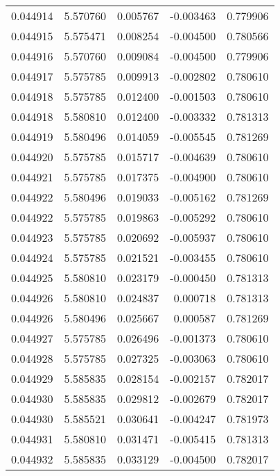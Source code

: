 \begin{tabular}{lrrrr}
0.044914    &  5.570760 &  0.005767 & -0.003463 &             0.779906 \\
0.044915    &  5.575471 &  0.008254 & -0.004500 &             0.780566 \\
0.044916    &  5.570760 &  0.009084 & -0.004500 &             0.779906 \\
0.044917    &  5.575785 &  0.009913 & -0.002802 &             0.780610 \\
0.044918    &  5.575785 &  0.012400 & -0.001503 &             0.780610 \\
0.044918    &  5.580810 &  0.012400 & -0.003332 &             0.781313 \\
0.044919    &  5.580496 &  0.014059 & -0.005545 &             0.781269 \\
0.044920    &  5.575785 &  0.015717 & -0.004639 &             0.780610 \\
0.044921    &  5.575785 &  0.017375 & -0.004900 &             0.780610 \\
0.044922    &  5.580496 &  0.019033 & -0.005162 &             0.781269 \\
0.044922    &  5.575785 &  0.019863 & -0.005292 &             0.780610 \\
0.044923    &  5.575785 &  0.020692 & -0.005937 &             0.780610 \\
0.044924    &  5.575785 &  0.021521 & -0.003455 &             0.780610 \\
0.044925    &  5.580810 &  0.023179 & -0.000450 &             0.781313 \\
0.044926    &  5.580810 &  0.024837 &  0.000718 &             0.781313 \\
0.044926    &  5.580496 &  0.025667 &  0.000587 &             0.781269 \\
0.044927    &  5.575785 &  0.026496 & -0.001373 &             0.780610 \\
0.044928    &  5.575785 &  0.027325 & -0.003063 &             0.780610 \\
0.044929    &  5.585835 &  0.028154 & -0.002157 &             0.782017 \\
0.044930    &  5.585835 &  0.029812 & -0.002679 &             0.782017 \\
0.044930    &  5.585521 &  0.030641 & -0.004247 &             0.781973 \\
0.044931    &  5.580810 &  0.031471 & -0.005415 &             0.781313 \\
0.044932    &  5.585835 &  0.033129 & -0.004500 &             0.782017 \\

\end{tabular}
